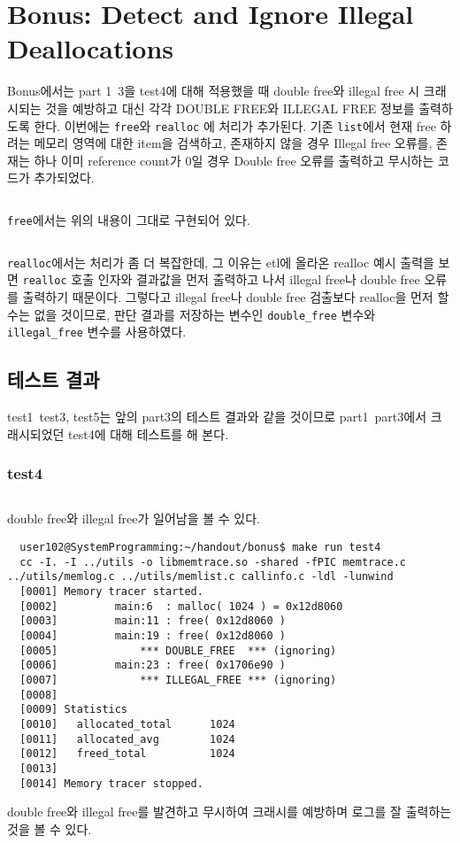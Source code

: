 \documentclass{report}
\begin{document}
\section{Bonus: Detect and Ignore Illegal Deallocations}
Bonus에서는 part 1~3을 test4에 대해 적용했을 때 double free와 illegal free 시 크래시되는 것을 예방하고 대신 각각 DOUBLE FREE와 ILLEGAL FREE 정보를 출력하도록 한다. 이번에는 \lstinline{free}와 \lstinline{realloc} 에 처리가 추가된다. 기존 \lstinline{list}에서 현재 free 하려는 메모리 영역에 대한 item을 검색하고, 존재하지 않을 경우 Illegal free 오류를, 존재는 하나 이미 reference count가 0일 경우 Double free 오류를 출력하고 무시하는 코드가 추가되었다.

\inputminted[firstline=45, lastline=60,linenos]{C}{2019-13674.224747/bonus/memtrace.c}
\lstinline{free}에서는 위의 내용이 그대로 구현되어 있다.

\inputminted[firstline=74, lastline=108,linenos]{C}{2019-13674.224747/bonus/memtrace.c}
\lstinline{realloc}에서는 처리가 좀 더 복잡한데, 그 이유는 etl에 올라온 realloc 예시 출력을 보면 \lstinline{realloc} 호출 인자와 결과값을 먼저 출력하고 나서 illegal free나 double free 오류를 출력하기 때문이다. 그렇다고 illegal free나 double free 검출보다 realloc을 먼저 할 수는 없을 것이므로, 판단 결과를 저장하는 변수인 \lstinline{double_free} 변수와 \lstinline{illegal_free} 변수를 사용하였다.

\subsection{테스트 결과}

test1~test3, test5는 앞의 part3의 테스트 결과와 같을 것이므로 part1~part3에서 크래시되었던 test4에 대해 테스트를 해 본다.
\subsubsection{test4}
\inputminted[firstline=5, lastline=10,linenos]{C}{2019-13674.224747/test/test4.c}
double free와 illegal free가 일어남을 볼 수 있다.
\begin{verbatim}
  user102@SystemProgramming:~/handout/bonus$ make run test4
  cc -I. -I ../utils -o libmemtrace.so -shared -fPIC memtrace.c ../utils/memlog.c ../utils/memlist.c callinfo.c -ldl -lunwind
  [0001] Memory tracer started.
  [0002]         main:6  : malloc( 1024 ) = 0x12d8060
  [0003]         main:11 : free( 0x12d8060 )
  [0004]         main:19 : free( 0x12d8060 )
  [0005]             *** DOUBLE_FREE  *** (ignoring)
  [0006]         main:23 : free( 0x1706e90 )
  [0007]             *** ILLEGAL_FREE *** (ignoring)
  [0008]
  [0009] Statistics
  [0010]   allocated_total      1024
  [0011]   allocated_avg        1024
  [0012]   freed_total          1024
  [0013]
  [0014] Memory tracer stopped.
\end{verbatim}
double free와 illegal free를 발견하고 무시하여 크래시를 예방하며 로그를 잘 출력하는 것을 볼 수 있다.
\end{document}
